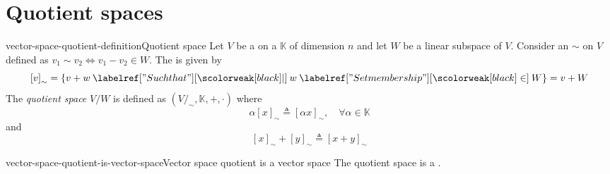 \documentclass[preview]{standalone}
\begin{document}
\genpage

\section{Quotient spaces}

\begin{snippetdefinition}{vector-space-quotient-definition}{Quotient space}
    Let \(V\) be a \vectorspace on a \field \(\mathbb{K}\)
    of dimension \(n\) and let \(W\) be a linear subspace of \(V\).
    Consider an \equivrelation \(\sim\) on \(V\) defined as
    \(v_1 \sim v_2 \iff v_1 - v_2 \in W\).
    The \equivclass is given by
    \[
        {[v]}_\sim = \{v + w \suchthat w \in W\} = v + W
    \]
    The \emph{quotient space} \(V/W\) is defined as \((V/_\sim, \mathbb{K}, +, \cdot)\)
    where
    \[
        \alpha {[x]}_\sim \triangleq {[\alpha x]}_\sim, \quad \forall \alpha \in \mathbb{K}
    \]
    and
    \[
        {[x]}_\sim + {[y]}_\sim \triangleq {[x + y]}_\sim
    \]
\end{snippetdefinition}



\begin{snippetproposition}{vector-space-quotient-is-vector-space}{Vector space quotient is a vector space}
    The quotient space is a \vectorspace.
\end{snippetproposition}
\end{document}

